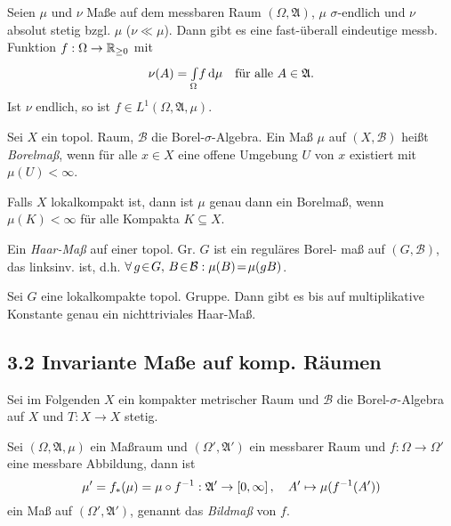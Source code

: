 \documentclass{cheat-sheet}
\newcommand{\Bor}{\mathcal{B}} %
\newcommand{\Alg}{\mathfrak{A}} %
\begin{document}
\begin{thm}
  Seien $\mu$ und $\nu$ Maße auf dem messbaren Raum $(\Omega, \Alg)$, $\mu$ $\sigma$-endlich und $\nu$ absolut stetig bzgl. $\mu$ ($\nu \ll \mu$).
  Dann gibt es eine fast-überall eindeutige messb. Funktion $f : \Omega \to \mathbb{R}_{\geq 0}$ mit
  \[
    \nu(A) = \Int{\Omega}{}{f}{\mu} \quad
    \text{für alle $A \in \Alg$}.
  \]
  Ist $\nu$ endlich, so ist $f \in L^1(\Omega, \Alg, \mu)$.
\end{thm}

\begin{defn}
  Sei $X$ ein topol. Raum, $\Bor$ die Borel-$\sigma$-Algebra.
  Ein Maß $\mu$ auf $(X, \Bor)$ heißt \emph{Borelmaß}, wenn für alle $x \in X$ eine offene Umgebung $U$ von $x$ existiert mit $\mu(U) < \infty$.
\end{defn}

\begin{bem}
  Falls $X$ lokalkompakt ist, dann ist $\mu$ genau dann ein Borelmaß, wenn $\mu(K) < \infty$ für alle Kompakta $K \subseteq X$.
\end{bem}

\begin{defn}
  Ein \emph{Haar-Maß} auf einer topol. Gr. $G$ ist ein reguläres Borel- maß auf $(G, \Bor)$, das linksinv. ist, d.h. $\fa{g \!\in\! G, \, B \!\in\! \Bor\!}\! \mu(B) \!=\! \mu(gB)$.
\end{defn}

\begin{thm}
  Sei $G$ eine lokalkompakte topol. Gruppe.
  Dann gibt es bis auf multiplikative Konstante genau ein nichttriviales Haar-Maß.
\end{thm}

\begin{samepage}
  \section{3.2 Invariante Maße auf komp. Räumen}
\end{samepage}

\begin{bem}
  Sei im Folgenden $X$ ein kompakter metrischer Raum und $\Bor$ die Borel-$\sigma$-Algebra auf $X$ und $T : X \to X$ stetig.
\end{bem}

\begin{defn}
  Sei $(\Omega, \Alg, \mu)$ ein Maßraum und $(\Omega', \Alg')$ ein messbarer Raum und $f : \Omega \to \Omega'$ eine messbare Abbildung, dann ist
  \[ \mu' = f_*(\mu) = \mu \circ f^{-1} : \Alg' \to \cinterval{0}{\infty}, \quad A' \mapsto \mu(f^{-1}(A')) \]
  ein Maß auf $(\Omega', \Alg')$, genannt das \emph{Bildmaß} von $f$.
\end{defn}
\end{document}
